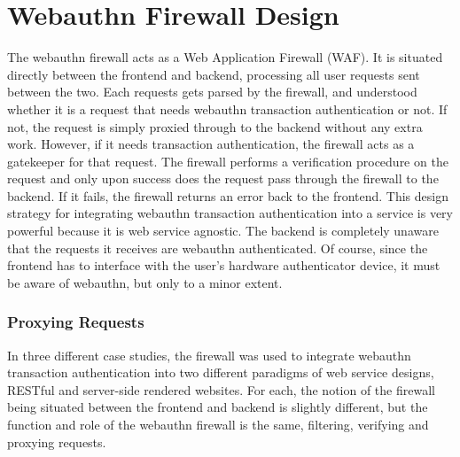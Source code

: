 \chapter{Webauthn Firewall Design}

The webauthn firewall acts as a Web Application Firewall (WAF). It is situated directly between the frontend and backend, processing all user requests sent between the two. Each requests gets parsed by the firewall, and understood whether it is a request that needs webauthn transaction authentication or not. If not, the request is simply proxied through to the backend without any extra work. However, if it needs transaction authentication, the firewall acts as a gatekeeper for that request. The firewall performs a verification procedure on the request and only upon success does the request pass through the firewall to the backend. If it fails, the firewall returns an error back to the frontend. This design strategy for integrating webauthn transaction authentication into a service is very powerful because it is web service agnostic. The backend is completely unaware that the requests it receives are webauthn authenticated. Of course, since the frontend has to interface with the user's hardware authenticator device, it must be aware of webauthn, but only to a minor extent. 

\subsection{Proxying Requests}

In three different case studies, the firewall was used to integrate webauthn transaction authentication into two different paradigms of web service designs, RESTful and server-side rendered websites. For each, the notion of the firewall being situated between the frontend and backend is slightly different, but the function and role of the webauthn firewall is the same, filtering, verifying and proxying requests. 


